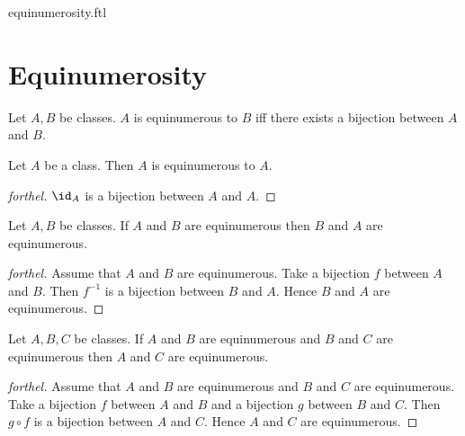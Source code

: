 \documentclass{naproche-library}
\begin{document}
\begin{smodule}{equinumerosity.ftl}

  \section*{Equinumerosity}

  \begin{definition}[forthel,id=FOUNDATIONS_13_4578620297183232,printid]
    Let $A, B$ be classes.
    $A$ is equinumerous to $B$ iff there exists a bijection between $A$ and $B$.
  \end{definition}

  \begin{proposition}[forthel,id=FOUNDATIONS_13_3703161885818880,printid]
    Let $A$ be a class.
    Then $A$ is equinumerous to $A$.
  \end{proposition}
  \begin{proof}[forthel]
    $\id_{A}$ is a bijection between $A$ and $A$.
  \end{proof}

  \begin{proposition}[forthel,id=FOUNDATIONS_13_8050301789536256,printid]
    Let $A, B$ be classes.
    If $A$ and $B$ are equinumerous then $B$ and $A$ are equinumerous.
  \end{proposition}
  \begin{proof}[forthel]
    Assume that $A$ and $B$ are equinumerous.
    Take a bijection $f$ between $A$ and $B$.
    Then $f^{-1}$ is a bijection between $B$ and $A$.
    Hence $B$ and $A$ are equinumerous.
  \end{proof}

  \begin{proposition}[forthel,id=FOUNDATIONS_13_3609912414306304,printid]
    Let $A, B, C$ be classes.
    If $A$ and $B$ are equinumerous and $B$ and $C$ are equinumerous then $A$ and $C$ are equinumerous.
  \end{proposition}
  \begin{proof}[forthel]
    Assume that $A$ and $B$ are equinumerous and $B$ and $C$ are equinumerous.
    Take a bijection $f$ between $A$ and $B$ and a bijection $g$ between $B$ and $C$.
    Then $g \circ f$ is a bijection between $A$ and $C$.
    Hence $A$ and $C$ are equinumerous.
  \end{proof}
\end{smodule}
\end{document}
